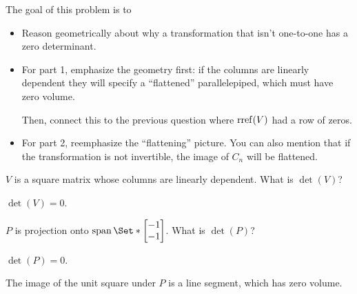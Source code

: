 \documentclass{problemset}
\newcommand{\bookonlynewpage}{\begin{bookonly}\newpage\end{bookonly}}
\begin{document}
	\bookonlynewpage
	\question
	\begin{annotation}
		\begin{goals}

			The goal of this problem is to
			\begin{itemize}
				\item Reason geometrically about why a transformation that isn't one-to-one
					has a zero determinant.
			\end{itemize}
		\end{goals}

		\begin{notes}
			\begin{itemize}
				\item For part 1, emphasize the geometry first: if 
					the columns are linearly dependent they will
					specify a ``flattened'' parallelepiped, which must have zero volume.

					Then, connect this to the previous question where $\operatorname{rref}(V)$ had a row of zeros.
				\item For part 2, reemphasize the ``flattening'' picture. You can also mention
					that if the transformation is not invertible, the image of $C_n$ will
					be flattened.
			\end{itemize}
		\end{notes}
	\end{annotation}
	\begin{parts}
		\item $V$ is a square matrix whose columns are linearly dependent.
			What is $\det(V)$?
			\begin{solution}
				$\det(V)=0$.
			\end{solution}
		\item $P$ is projection onto $\Span\Set*{\mat{-1\\-1}}$. What is $\det(P)$?
			\begin{solution}
				$\det(P)=0$.

				The image of the unit square under $P$ is a line segment, which
				has zero volume.
			\end{solution}
	\end{parts}
\end{document}
